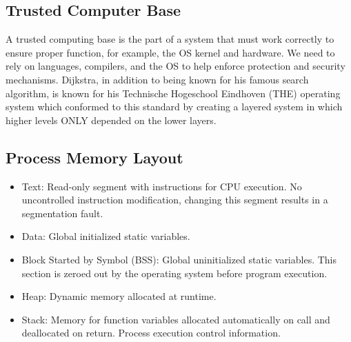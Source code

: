 \documentclass{math}
\begin{document}
\subsection*{Trusted Computer Base}
A trusted computing base is the part of a system that must work correctly to
ensure proper function, for example, the OS kernel and hardware. We need to
rely on languages, compilers, and the OS to help enforce protection and security
mechanisms. Dijkstra, in addition to being known for his famous search
algorithm, is known for his Technische Hogeschool Eindhoven (THE) operating
system which conformed to this standard by creating a layered system in which
higher levels ONLY depended on the lower layers.

\subsection*{Process Memory Layout}
\begin{itemize}
  \item Text: Read-only segment with instructions for CPU execution. No
  uncontrolled instruction modification, changing this segment results in a
  segmentation fault.
  \item Data: Global initialized static variables.
  \item Block Started by Symbol (BSS): Global uninitialized static variables.
  This section is zeroed out by the operating system before program execution.
  \item Heap: Dynamic memory allocated at runtime.
  \item Stack: Memory for function variables allocated automatically on call
  and deallocated on return. Process execution control information.
\end{itemize}
\end{document}
